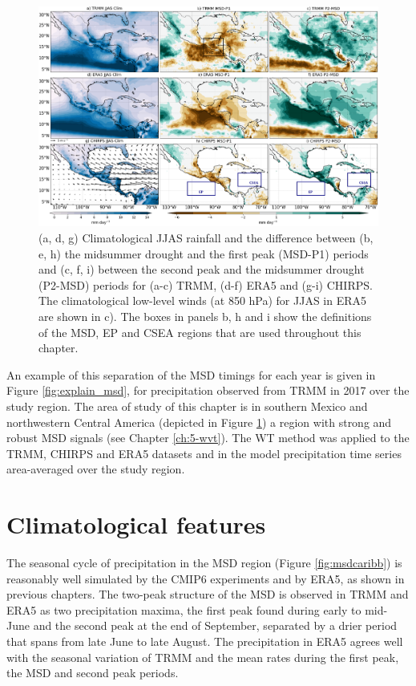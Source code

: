   \begin{figure}[b!]
\includegraphics[width=\linewidth]{figures/fig2obs_prdiff_2.png}
\caption[Observed composites of climatological and seasonal variations of precipitation.]{ (a, d, g) Climatological JJAS rainfall and the difference between  (b, e, h)  the midsummer drought and the first peak (MSD-P1) periods and (c, f, i)  between the second peak and the midsummer drought (P2-MSD) periods for (a-c) TRMM, (d-f) ERA5 and (g-i) CHIRPS. The climatological low-level winds (at 850 hPa) for JJAS in ERA5 are shown in c). The boxes in panels b, h and i show the definitions of the MSD, EP and CSEA regions that are used throughout this chapter.  }
\label{fig:eof2}
\end{figure} 


 An example of this separation of the MSD timings for each year is given in Figure \ref{fig:explain_msd}, for precipitation observed from TRMM in 2017 over the study region.
The area of study of this chapter is in southern Mexico and northwestern Central America (depicted in Figure \ref{fig:eof2}) a region with strong and robust MSD signals (see Chapter \ref{ch:5-wvt}). The WT method was applied to the TRMM, CHIRPS and ERA5 datasets and in the model precipitation time series area-averaged over the study region. 


\section{Climatological features}

\label{sq:msdclim} 

The seasonal cycle of precipitation in the MSD region (Figure \ref{fig:msdcaribb}) is reasonably well simulated by the CMIP6 experiments and by ERA5, as shown in previous chapters.
The two-peak structure of the MSD is observed in TRMM and ERA5 as two precipitation maxima, the first peak found during early to mid-June and the second peak at the end of September, separated by a drier period that spans from late June to late August. The precipitation in ERA5  agrees well with the seasonal variation of TRMM and the mean rates during the first peak, the MSD and second peak periods.

